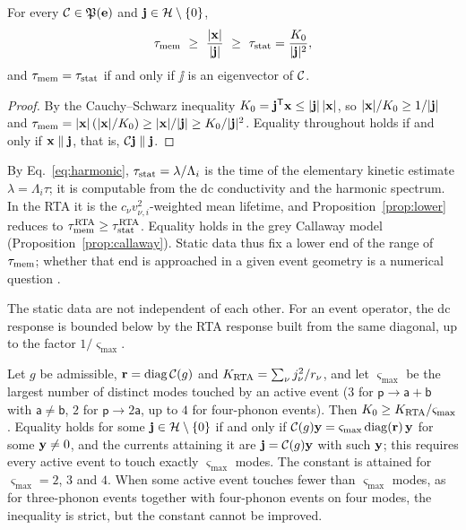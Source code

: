 \begin{proposition}\label{prop:lower}
For every $\mathcal C\in\mathfrak P(\mathbf e)$ and $\mathbf j\in\mathcal H\setminus\{0\}$,
\begin{equation}
\tmem\ \ge\ \frac{|\xx|}{|\jj|}\ \ge\ \tstat=\frac{K_0}{|\jj|^2},
\label{eq:lower}
\end{equation}
and $\tau_{\rm mem}=\tau_{\rm stat}$ if and only if $\jj$ is an eigenvector of $\mathcal C$.
\end{proposition}

\begin{proof}
By the Cauchy--Schwarz inequality $K_0=\mathbf j^{\mathsf T}\mathbf x\le|\mathbf j|\,|\mathbf x|$, so $|\mathbf x|/K_0\ge1/|\mathbf j|$ and
$\tau_{\rm mem}=|\mathbf x|\,(|\mathbf x|/K_0)\ge|\mathbf x|/|\mathbf j|\ge K_0/|\mathbf j|^2$. Equality throughout holds if and only if
$\mathbf x\parallel\mathbf j$, that is, $\mathcal C\mathbf j\parallel\mathbf j$.
\end{proof}

By Eq.~\eqref{eq:harmonic}, $\tau_{\rm stat}=\lambda/\Lambda_i$ is the time of the elementary kinetic estimate
$\lambda=\Lambda_i\tau$; it is computable from the dc conductivity and the harmonic spectrum. In the
RTA it is the $c_\nu v_{\nu,i}^2$-weighted mean lifetime, and Proposition~\ref{prop:lower} reduces to
$\tau_{\rm mem}^{\rm RTA}\ge\tau_{\rm stat}^{\rm RTA}$. Equality holds in the grey Callaway model
(Proposition~\ref{prop:callaway}). Static data thus fix a lower end of the range of $\tau_{\rm mem}$; whether that
end is approached in a given event geometry is a numerical question .

The static data are not independent of each other. For an event operator, the dc response is bounded
below by the RTA response built from the same diagonal, up to the factor $1/\varsigma_{\max}$.

\begin{lemma}\label{lem:rta}
Let $g$ be admissible, $\mathbf r=\mathrm{diag}\,\mathcal C(g)$ and $K_{\rm RTA}=\sum_\nu j_\nu^2/r_\nu$, and let
$\varsigma_{\max}$ be the largest number of distinct modes touched by an active event ($3$ for
$\mathsf p\to\mathsf a+\mathsf b$ with $\mathsf a\ne\mathsf b$, $2$ for $\mathsf p\to2\mathsf a$, up to $4$ for
four-phonon events). Then $K_0\ge K_{\rm RTA}/\varsigma_{\max}$. Equality holds for some
$\mathbf j\in\mathcal H\setminus\{0\}$ if and only if $\mathcal C(g)\mathbf y=\varsigma_{\max}\,\mathrm{diag}(\mathbf r)\,\mathbf y$ for some
$\mathbf y\ne0$, and the currents attaining it are $\mathbf j=\mathcal C(g)\mathbf y$ with such $\mathbf y$; this requires every active
event to touch exactly $\varsigma_{\max}$ modes. The constant is attained for $\varsigma_{\max}=2$, $3$ and $4$.
When some active event touches fewer than $\varsigma_{\max}$ modes, as for three-phonon events together with
four-phonon events on four modes, the inequality is strict, but the constant cannot be improved.
\end{lemma}

